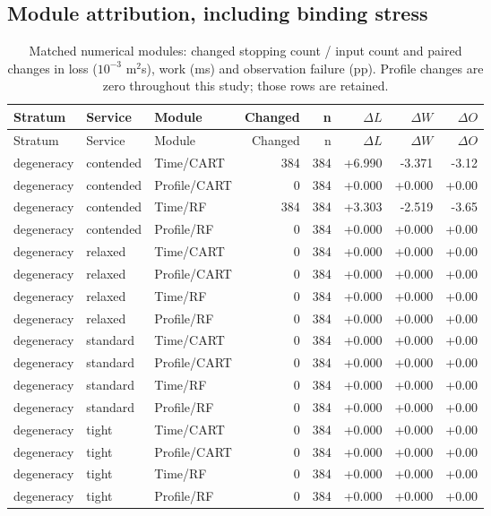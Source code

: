 \subsection{Module attribution, including binding stress}
\small\begin{longtable}{@{}lllrrrrr@{}}
\caption{Matched numerical modules: changed stopping count / input count and paired changes in loss ($10^{-3}$ m$^2$s), work (ms) and observation failure (pp). Profile changes are zero throughout this study; those rows are retained.}\label{supp:ablations}\\\toprule
Stratum & Service & Module & Changed & n & $\Delta L$ & $\Delta W$ & $\Delta O$\\\midrule\endfirsthead
\toprule
Stratum & Service & Module & Changed & n & $\Delta L$ & $\Delta W$ & $\Delta O$\\\midrule\endhead
degeneracy & contended & Time/CART & 384 & 384 & +6.990 & -3.371 & -3.12\\
degeneracy & contended & Profile/CART & 0 & 384 & +0.000 & +0.000 & +0.00\\
degeneracy & contended & Time/RF & 384 & 384 & +3.303 & -2.519 & -3.65\\
degeneracy & contended & Profile/RF & 0 & 384 & +0.000 & +0.000 & +0.00\\
degeneracy & relaxed & Time/CART & 0 & 384 & +0.000 & +0.000 & +0.00\\
degeneracy & relaxed & Profile/CART & 0 & 384 & +0.000 & +0.000 & +0.00\\
degeneracy & relaxed & Time/RF & 0 & 384 & +0.000 & +0.000 & +0.00\\
degeneracy & relaxed & Profile/RF & 0 & 384 & +0.000 & +0.000 & +0.00\\
degeneracy & standard & Time/CART & 0 & 384 & +0.000 & +0.000 & +0.00\\
degeneracy & standard & Profile/CART & 0 & 384 & +0.000 & +0.000 & +0.00\\
degeneracy & standard & Time/RF & 0 & 384 & +0.000 & +0.000 & +0.00\\
degeneracy & standard & Profile/RF & 0 & 384 & +0.000 & +0.000 & +0.00\\
degeneracy & tight & Time/CART & 0 & 384 & +0.000 & +0.000 & +0.00\\
degeneracy & tight & Profile/CART & 0 & 384 & +0.000 & +0.000 & +0.00\\
degeneracy & tight & Time/RF & 0 & 384 & +0.000 & +0.000 & +0.00\\
degeneracy & tight & Profile/RF & 0 & 384 & +0.000 & +0.000 & +0.00\\

\end{longtable}
